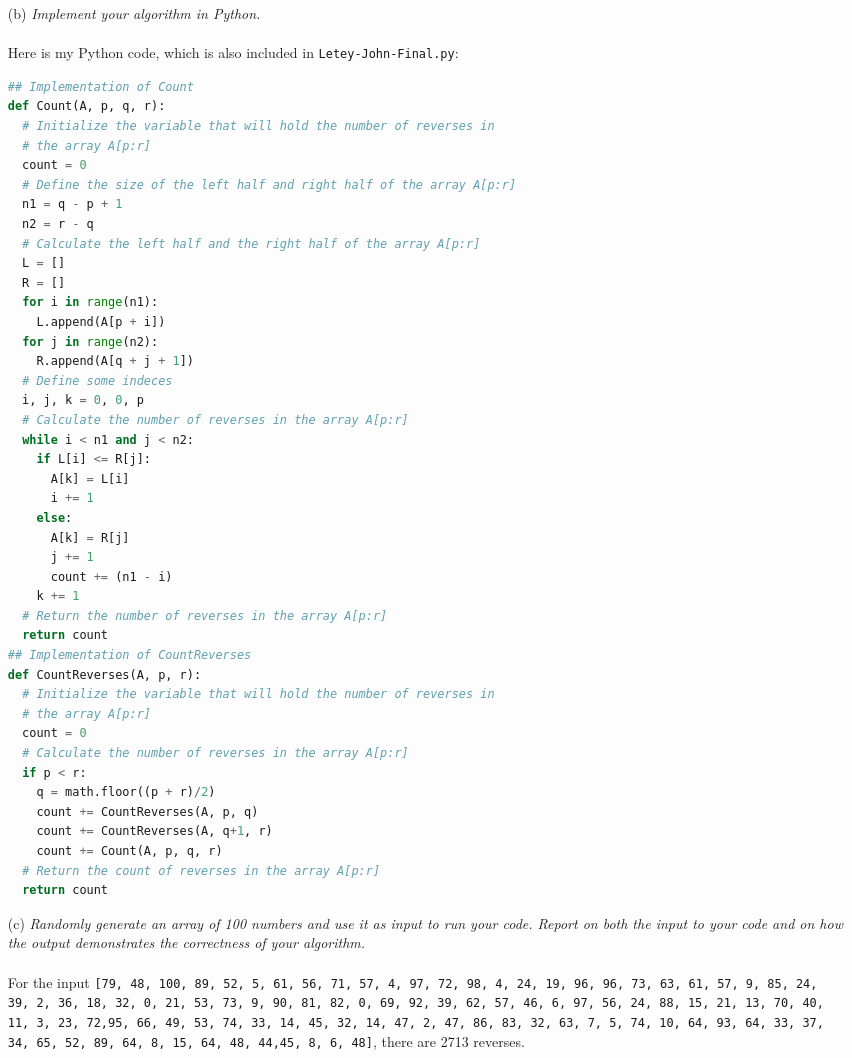 \documentclass[12pt]{article}
\begin{document}
{\begin{enumerate}
\begin{lstlisting}
  for i = 1 to n1
    L[i] = A[p + i - 1]
  for j = 1 to n2
    R[j] = A[q + j]
  L[n1 + 1] = infinity
  R[n2 + 1] = infinity
  i = 1
  j = 1
  for k = p to r
    if L[i] <= R[j]
      A[k] = L[i]
      i = i + 1
    else 
      A[k] = R[j]
      j = j + 1
\end{lstlisting}
The pseudocode for the \texttt{Merge} procedure won't need a lot of changes. All I need to do is add a counter for it to return. I will also be getting rid of lines 8 and 9 of the pseudocode.
\item[(b)]\textsl{Implement your algorithm in Python.}\\ \\
Here is my Python code, which is also included in \texttt{Letey-John-Final.py}:
\begin{lstlisting}[language=Python]
## Implementation of Count
def Count(A, p, q, r):
  # Initialize the variable that will hold the number of reverses in 
  # the array A[p:r]
  count = 0
  # Define the size of the left half and right half of the array A[p:r]
  n1 = q - p + 1
  n2 = r - q
  # Calculate the left half and the right half of the array A[p:r]
  L = []
  R = []
  for i in range(n1):
    L.append(A[p + i])
  for j in range(n2):
    R.append(A[q + j + 1])
  # Define some indeces
  i, j, k = 0, 0, p
  # Calculate the number of reverses in the array A[p:r]
  while i < n1 and j < n2:
    if L[i] <= R[j]:
      A[k] = L[i]
      i += 1
    else:
      A[k] = R[j]
      j += 1
      count += (n1 - i)
    k += 1
  # Return the number of reverses in the array A[p:r]
  return count
## Implementation of CountReverses
def CountReverses(A, p, r):
  # Initialize the variable that will hold the number of reverses in
  # the array A[p:r]
  count = 0
  # Calculate the number of reverses in the array A[p:r]
  if p < r:
    q = math.floor((p + r)/2)
    count += CountReverses(A, p, q)
    count += CountReverses(A, q+1, r)
    count += Count(A, p, q, r)
  # Return the count of reverses in the array A[p:r]
  return count
\end{lstlisting}
\item[(c)]\textsl{Randomly generate an array of 100 numbers and use it as input to run your code. Report on both the input to your code and on how the output demonstrates the correctness of your algorithm.}\\ \\
For the input \texttt{[79, 48, 100, 89, 52, 5, 61, 56, 71, 57, 4, 97, 72, 98, 4, 24, 19, 96, 96, 73, 63, 61, 57, 9, 85, 24, 39, 2, 36, 18, 32, 0, 21, 53, 73, 9, 90, 81, 82, 0, 69, 92, 39, 62, 57, 46, 6, 97, 56, 24, 88, 15, 21, 13, 70, 40, 11, 3, 23, 72,95, 66, 49, 53, 74, 33, 14, 45, 32, 14, 47, 2, 47, 86, 83, 32, 63, 7, 5, 74, 10, 64, 93, 64, 33, 37, 34, 65, 52, 89, 64, 8, 15, 64, 48, 44,45, 8, 6, 48]}, there are 2713 reverses.
\end{enumerate}

}
\end{document}
